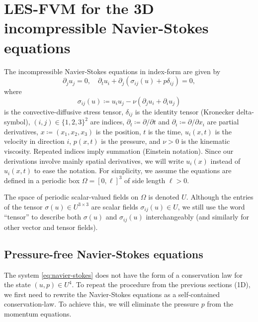 \documentclass[preprint,twocolumn,5p]{elsarticle}
\begin{document}
\section{LES-FVM for the 3D incompressible Navier-Stokes equations}
\label{sec:navier-stokes}

The incompressible Navier-Stokes equations in index-form are given by
\begin{equation} \label{eq:navier-stokes}
    \partial_j u_j = 0, \quad
    \partial_t u_i +
    \partial_j \left( \sigma_{i j}(u) + p \delta_{i j} \right) =
    0,
\end{equation}
where
\begin{equation} \label{eq:stress}
    \sigma_{i j}(u) \coloneq u_i u_j - \nu \left(\partial_j u_i + \partial_i u_j\right)
\end{equation}
is the convective-diffusive stress tensor,
$\delta_{i j}$ is the identity tensor (Kronecker delta-symbol),
$(i, j) \in \{1, 2, 3\}^2$ are indices, 
$\partial_t \coloneq \partial / \partial t$ and
$\partial_i \coloneq \partial / \partial x_i$ are partial derivatives,
$x \coloneq (x_1, x_2, x_3)$ is the position,
$t$ is the time,
$u_i(x, t)$ is the velocity in direction $i$,
$p(x, t)$ is the pressure,
and $\nu > 0$ is the kinematic viscosity.
Repeated indices imply summation (Einstein notation).
Since our derivations involve mainly spatial derivatives,
we will write $u_i(x)$ instead of $u_i(x, t)$
to ease the notation.
For simplicity, we assume the equations are defined in a periodic box
$\Omega = [0, \ell]^3$ of side length $\ell > 0$.

The space of periodic scalar-valued fields on $\Omega$ is denoted $U$.
Although the entries of the tensor
$\sigma(u) \in U^{3 \times 3}$ are scalar fields
$\sigma_{i j}(u) \in U$, we still use the word ``tensor'' to describe
both $\sigma(u)$ and $\sigma_{i j}(u)$ interchangeably
(and similarly for other vector and tensor fields).

\subsection{Pressure-free Navier-Stokes equations}

The system \eqref{eq:navier-stokes} does not have the form of a
conservation law for the state $(u, p) \in U^4$. To repeat the
procedure from the previous sections (1D), we first need to
rewrite the Navier-Stokes equations as a self-contained conservation-law. To
achieve this, we will eliminate the pressure $p$ from the momentum equations.
\end{document}
